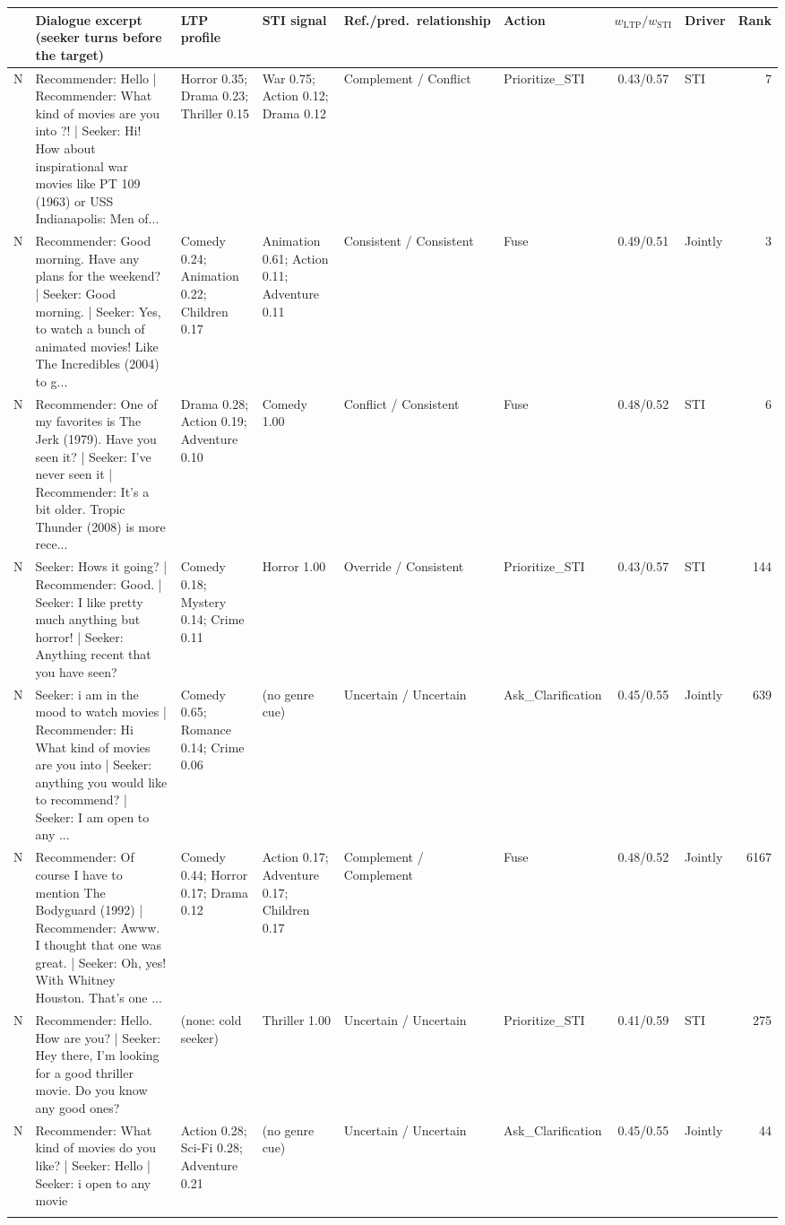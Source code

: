 \begin{tabular}{@{}c p{5.6cm} p{2.6cm} p{2.6cm} p{2.0cm} l c l r@{}}
\toprule
& Dialogue excerpt (seeker turns before the target) & LTP profile & STI signal & Ref./pred.\ relationship & Action & $w_{\text{LTP}}/w_{\text{STI}}$ & Driver & Rank \\
\midrule
N & Recommender: Hello | Recommender: What kind of movies are you into ?! | Seeker: Hi!  How about inspirational war movies like PT 109  (1963) or USS Indianapolis: Men of... & Horror 0.35; Drama 0.23; Thriller 0.15 & War 0.75; Action 0.12; Drama 0.12 & Complement / Conflict & Prioritize\_STI & 0.43/0.57 & STI & 7 \\ \addlinespace
N & Recommender: Good morning. Have any plans for the weekend? | Seeker: Good morning. | Seeker: Yes, to watch a bunch of animated movies! Like The Incredibles (2004) to g... & Comedy 0.24; Animation 0.22; Children 0.17 & Animation 0.61; Action 0.11; Adventure 0.11 & Consistent / Consistent & Fuse & 0.49/0.51 & Jointly & 3 \\ \addlinespace
N & Recommender: One of my favorites is The Jerk (1979). Have you seen it? | Seeker: I've never seen it | Recommender: It's a bit older. Tropic Thunder (2008) is more rece... & Drama 0.28; Action 0.19; Adventure 0.10 & Comedy 1.00 & Conflict / Consistent & Fuse & 0.48/0.52 & STI & 6 \\ \addlinespace
N & Seeker: Hows it going? | Recommender: Good. | Seeker: I like pretty much anything but horror! | Seeker: Anything recent that you have seen? & Comedy 0.18; Mystery 0.14; Crime 0.11 & Horror 1.00 & Override / Consistent & Prioritize\_STI & 0.43/0.57 & STI & 144 \\ \addlinespace
N & Seeker: i am in the mood to watch movies | Recommender: Hi What kind of movies are you into | Seeker: anything you would like to recommend? | Seeker: I am open to any ... & Comedy 0.65; Romance 0.14; Crime 0.06 & (no genre cue) & Uncertain / Uncertain & Ask\_Clarification & 0.45/0.55 & Jointly & 639 \\ \addlinespace
N & Recommender: Of course I have to mention The Bodyguard  (1992) | Recommender: Awww. I thought that one was great. | Seeker: Oh, yes!  With Whitney Houston. That's one ... & Comedy 0.44; Horror 0.17; Drama 0.12 & Action 0.17; Adventure 0.17; Children 0.17 & Complement / Complement & Fuse & 0.48/0.52 & Jointly & 6167 \\ \addlinespace
N & Recommender: Hello. How are you? | Seeker: Hey there, I'm looking for a good thriller movie. Do you know any good ones? & (none: cold seeker) & Thriller 1.00 & Uncertain / Uncertain & Prioritize\_STI & 0.41/0.59 & STI & 275 \\ \addlinespace
N & Recommender: What kind of movies do you like? | Seeker: Hello | Seeker: i open to any movie & Action 0.28; Sci-Fi 0.28; Adventure 0.21 & (no genre cue) & Uncertain / Uncertain & Ask\_Clarification & 0.45/0.55 & Jointly & 44 \\ \addlinespace
\bottomrule
\end{tabular}
